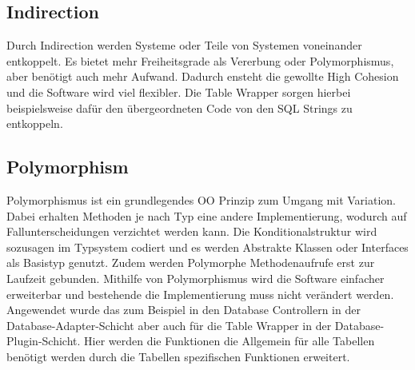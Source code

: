 \subsection{Indirection}
Durch Indirection werden Systeme oder Teile von Systemen voneinander entkoppelt.
Es bietet mehr Freiheitsgrade als Vererbung oder Polymorphismus, aber benötigt auch mehr Aufwand.
Dadurch ensteht die gewollte High Cohesion und die Software wird viel flexibler.
Die Table Wrapper sorgen hierbei beispielsweise dafür den übergeordneten Code von den SQL Strings zu entkoppeln.
\subsection{Polymorphism}
Polymorphismus ist ein grundlegendes OO Prinzip zum Umgang mit Variation.
Dabei erhalten Methoden je nach Typ eine andere Implementierung, wodurch auf Fallunterscheidungen verzichtet werden kann.
Die Konditionalstruktur wird sozusagen im Typsystem codiert und es werden Abstrakte Klassen oder Interfaces als Basistyp genutzt.
Zudem werden Polymorphe Methodenaufrufe erst zur Laufzeit gebunden.
Mithilfe von Polymorphismus wird die Software einfacher erweiterbar und bestehende die Implementierung muss nicht verändert werden.
Angewendet wurde das zum Beispiel in den Database Controllern in der Database-Adapter-Schicht aber auch für die Table Wrapper in der Database-Plugin-Schicht.
Hier werden die Funktionen die Allgemein für alle Tabellen benötigt werden durch die Tabellen spezifischen Funktionen erweitert.
